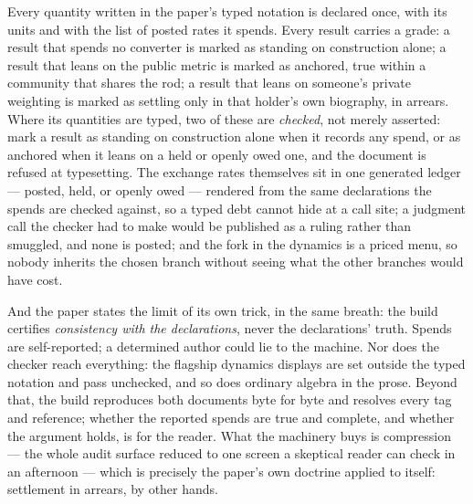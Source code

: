\documentclass[../main_explainer]{subfiles}
\begin{document}
Every quantity written in the paper's typed notation is declared once, with its units
and with the list of posted rates it spends. Every result carries a grade: a result that
spends no converter is marked as standing on construction alone; a result that leans on
the public metric is marked as anchored, true within a community that shares the rod; a
result that leans on someone's private weighting is marked as settling only in that
holder's own biography, in arrears. Where its quantities are typed, two of these are
\emph{checked}, not merely asserted: mark a result as standing on construction alone when it records any spend, or as anchored
when it leans on a held or openly owed one, and the document is refused at typesetting. The exchange rates themselves sit in one generated
ledger --- posted, held, or openly owed --- rendered from the same declarations the
spends are checked against, so a typed debt cannot hide at a call site; a judgment call
the checker had to make would be published as a ruling rather than smuggled, and none
is posted; and the fork in the dynamics is a priced menu, so nobody inherits the chosen
branch without seeing what the other branches would have cost.

And the paper states the limit of its own trick, in the same breath: the build
certifies \emph{consistency with the declarations}, never the declarations' truth.
Spends are self-reported; a determined author could lie to the machine. Nor does the
checker reach everything: the flagship dynamics displays are set outside the typed
notation and pass unchecked, and so does ordinary algebra in the prose. Beyond that,
the build reproduces both documents byte for byte and resolves every tag and
reference; whether the reported spends are true and complete, and whether the argument
holds, is for the reader. What the machinery buys is compression --- the whole audit
surface reduced to one screen a skeptical reader can check in an afternoon --- which is
precisely the paper's own doctrine applied to itself: settlement in arrears, by other
hands.

\end{document}
